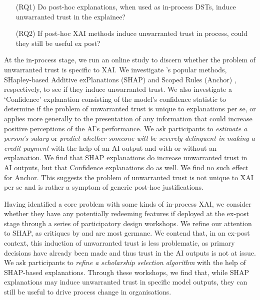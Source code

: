 \begin{enumerate}
    \item[(RQ1)] Do post-hoc explanations, when used as in-process DSTs, induce unwarranted trust in the explainee?
    \item[(RQ2)] If post-hoc XAI methods induce unwarranted trust in process, could they still be useful ex post?
\end{enumerate}

At the in-process stage, we run an online study to discern whether the problem of unwarranted trust is specific to XAI. We investigate \textcite{lundberg_unified_2017,ribeiro_anchors_2018}'s popular methods, SHapley-based Additive exPlanations (SHAP) \cite{lundberg_unified_2017} and Scoped Rules (Anchor) \cite{ribeiro_anchors_2018}, respectively, to see if they induce unwarranted trust. We also investigate a `Confidence' explanation consisting of the model's confidence statistic to determine if the problem of unwarranted trust is unique to explanations per se, or applies more generally to the presentation of any information that could increase positive perceptions of the AI's performance. We ask participants to \emph{estimate a person's salary} \cite{kohavi_scaling_1996} or \emph{predict whether someone will be severely delinquent in making a credit payment} \cite{GiveMeSomeCredit} with the help of an AI output and with or without an explanation. We find that SHAP explanations do increase unwarranted trust in AI outputs, but that Confidence explanations do as well. We find no such effect for Anchor. This suggests the problem of unwarranted trust is not unique to XAI per se and is rather a symptom of generic post-hoc justifications.

Having identified a core problem with some kinds of in-process XAI, we consider whether they have any potentially redeeming features if deployed at the ex-post stage through a series of participatory design workshops. We refine our attention to SHAP, as critiques by \textcite{Lipton} and \textcite{miller_explainable_2023} are most germane. We contend that, in an ex-post context, this induction of unwarranted trust is less problematic, as primary decisions have already been made and thus trust in the AI outputs is not at issue. We ask participants to \emph{refine a scholarship selection algorithm} with the help of SHAP-based explanations. Through these workshops, we find that, while SHAP explanations may induce unwarranted trust in specific model outputs, they can still be useful to drive process change in organisations.

